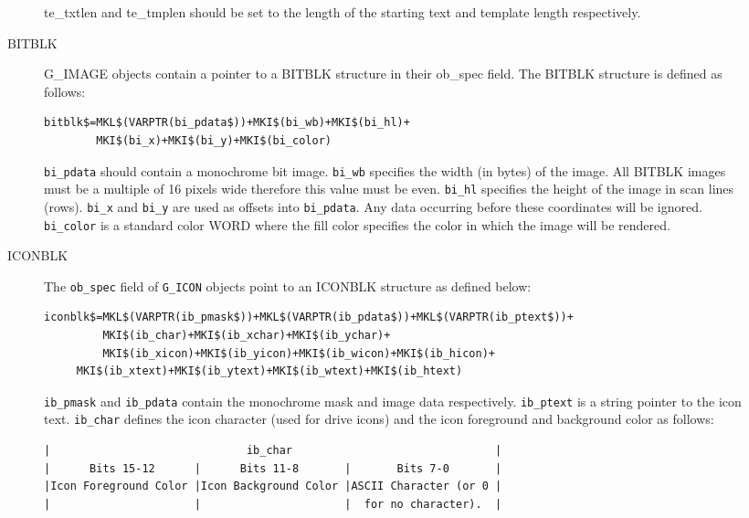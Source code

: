 \begin{description}
\begin{description}
te\_txtlen and
te\_tmplen should be set to the length of the starting text and
template length respectively. 

\item[BITBLK]
G\_IMAGE objects contain a pointer to a BITBLK structure in their
ob\_spec field. The BITBLK structure is defined as follows:

 {\footnotesize
\begin{verbatim}                                                         
bitblk$=MKL$(VARPTR(bi_pdata$))+MKI$(bi_wb)+MKI$(bi_hl)+
        MKI$(bi_x)+MKI$(bi_y)+MKI$(bi_color)
\end{verbatim}}

\verb|bi_pdata| should contain a monochrome bit image. 
\verb|bi_wb| specifies the width (in bytes) of the image. 
All BITBLK images must be a multiple of 16 pixels wide therefore this 
value must be even.
\verb|bi_hl| specifies the height of the image in scan lines (rows). 
\verb|bi_x| and \verb|bi_y| are used as offsets into \verb|bi_pdata|. 
Any data occurring before these coordinates will be ignored. 
\verb|bi_color| is a standard color WORD
where the fill color specifies the color in which the image will be
rendered.

\item[ICONBLK]
The \verb|ob_spec| field of \verb|G_ICON| objects point to an ICONBLK structure as
defined below:

 {\footnotesize
\begin{verbatim}                                                         
iconblk$=MKL$(VARPTR(ib_pmask$))+MKL$(VARPTR(ib_pdata$))+MKL$(VARPTR(ib_ptext$))+
         MKI$(ib_char)+MKI$(ib_xchar)+MKI$(ib_ychar)+
         MKI$(ib_xicon)+MKI$(ib_yicon)+MKI$(ib_wicon)+MKI$(ib_hicon)+
	 MKI$(ib_xtext)+MKI$(ib_ytext)+MKI$(ib_wtext)+MKI$(ib_htext)
\end{verbatim}}

\verb|ib_pmask| and \verb|ib_pdata| contain the monochrome mask and 
image data respectively. \verb|ib_ptext| is a string pointer to the icon text.
\verb|ib_char| defines the icon character (used for drive icons) and the icon
foreground and background color as follows:

 {\footnotesize
\begin{verbatim}                                                         
|                              ib_char                               |
|      Bits 15-12      |      Bits 11-8       |       Bits 7-0       |
|Icon Foreground Color |Icon Background Color |ASCII Character (or 0 |
|                      |                      |  for no character).  |
\end{verbatim}}


\end{description}
\end{description}
